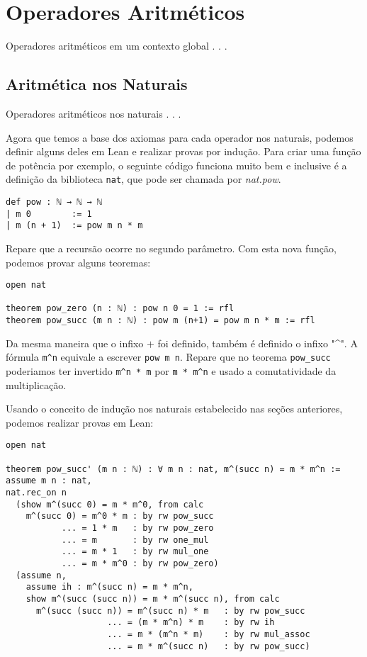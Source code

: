 \section{Operadores Aritméticos}

Operadores aritméticos em um contexto global . . .

\subsection{Aritmética nos Naturais}

Operadores aritméticos nos naturais . . .

Agora que temos a base dos axiomas para cada operador nos naturais, podemos definir alguns deles em Lean e realizar provas por indução. Para criar uma função de potência por exemplo, o seguinte código funciona muito bem e inclusive é a definição da biblioteca \lstinline{nat}, que pode ser chamada por \textit{nat.pow}.

\begin{lstlisting}
def pow : ℕ → ℕ → ℕ
| m 0        := 1
| m (n + 1)  := pow m n * m
\end{lstlisting}

Repare que a recursão ocorre no segundo parâmetro. Com esta nova função, podemos provar alguns teoremas:

\begin{lstlisting}
open nat

theorem pow_zero (n : ℕ) : pow n 0 = 1 := rfl
theorem pow_succ (m n : ℕ) : pow m (n+1) = pow m n * m := rfl
\end{lstlisting}

Da mesma maneira que o infixo $+$ foi definido, também é definido o infixo "\textasciicircum ". A fórmula \lstinline{m^n} equivale a escrever \lstinline{pow m n}. Repare que no teorema \lstinline{pow_succ} poderiamos ter invertido \lstinline{m^n * m} por \lstinline{m * m^n} e usado a comutatividade da multiplicação.

Usando o conceito de indução nos naturais estabelecido nas seções anteriores, podemos realizar provas em Lean:

\begin{lstlisting}
open nat

theorem pow_succ' (m n : ℕ) : ∀ m n : nat, m^(succ n) = m * m^n :=
assume m n : nat,
nat.rec_on n 
  (show m^(succ 0) = m * m^0, from calc
    m^(succ 0) = m^0 * m : by rw pow_succ
           ... = 1 * m   : by rw pow_zero
           ... = m       : by rw one_mul
           ... = m * 1   : by rw mul_one
           ... = m * m^0 : by rw pow_zero)
  (assume n,
    assume ih : m^(succ n) = m * m^n,
    show m^(succ (succ n)) = m * m^(succ n), from calc
      m^(succ (succ n)) = m^(succ n) * m   : by rw pow_succ
                    ... = (m * m^n) * m    : by rw ih
                    ... = m * (m^n * m)    : by rw mul_assoc
                    ... = m * m^(succ n)   : by rw pow_succ)
\end{lstlisting}

